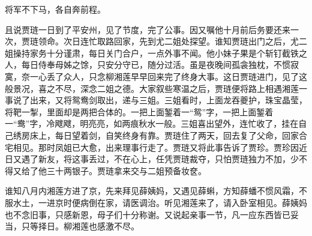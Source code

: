 将军不下马，各自奔前程。

且说贾琏一日到了平安州，见了节度，完了公事。因又嘱他十月前后务要还来一次，贾琏领命。次日连忙取路回家，先到尤二姐处探望。谁知贾琏出门之后，尤二姐操持家务十分谨肃，每日关门合户，一点外事不闻。他小妹子果是个斩钉截铁之人，每日侍奉母姊之馀，只安分守已，随分过活。虽是夜晚间孤衾独枕，不惯寂寞，奈一心丢了众人，只念柳湘莲早早回来完了终身大事。这日贾琏进门，见了这般景况，喜之不尽，深念二姐之德。大家叙些寒温之后，贾琏便将路上相遇湘莲一事说了出来，又将鸳鸯剑取出，递与三姐。三姐看时，上面龙吞夔护，珠宝晶莹，将靶一掣，里面却是两把合体的。一把上面錾着一“鸳”字，一把上面錾着一“鸯”字，冷飕飕，明亮亮，如两痕秋水一般。三姐喜出望外，连忙收了，挂在自己绣房床上，每日望着剑，自笑终身有靠。贾琏住了两天，回去复了父命，回家合宅相见。那时凤姐已大愈，出来理事行走了。贾琏又将此事告诉了贾珍。贾珍因近日又遇了新友，将这事丢过，不在心上，任凭贾琏裁夺，只怕贾琏独力不加，少不得又给了他三十两银子。贾琏拿来交与二姐预备妆奁。

谁知八月内湘莲方进了京，先来拜见薛姨妈，又遇见薛蝌，方知薛蟠不惯风霜，不服水土，一进京时便病倒在家，请医调治。听见湘莲来了，请入卧室相见。薛姨妈也不念旧事，只感新恩，母子们十分称谢。又说起亲事一节，凡一应东西皆已妥当，只等择日。柳湘莲也感激不尽。

